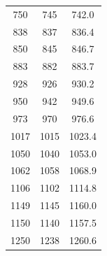 \begin{table}[!htb]
\begin{minipage}[t]{0.5\textwidth}
\begin{tabular}{ccc}
      750  &  745  & 742.0 \\
      838  &  837  & 836.4 \\
      850  &  845  & 846.7 \\
      883  &  882  & 883.7 \\
      928  &  926  & 930.2 \\
      950  &  942  & 949.6 \\
      973  &  970  & 976.6  \\
      1017 &  1015 & 1023.4 \\
      1050 &  1040 & 1053.0 \\
      1062 &  1058 & 1068.9 \\
      1106 &  1102 & 1114.8 \\
      1149 &  1145 & 1160.0 \\
      1150 &  1140 & 1157.5 \\
      1250 &  1238 & 1260.6 \\
      \hline
    \end{tabular}

  \end{minipage}

\end{table}







